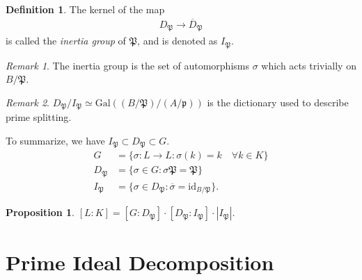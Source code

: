 \documentclass[12pt]{article}
\theoremstyle{plain}
\newtheorem{proposition}[theorem]{Proposition}
\theoremstyle{remark}
\newtheorem*{remark}{Remark}
\theoremstyle{definition}
\newtheorem{definition}[theorem]{Definition}
\begin{document}
\begin{definition}
    The kernel of the map
    \begin{align*}
        D_\mathfrak{P} \to \overline{D}_{\mathfrak{P}}
    \end{align*}
    is called the \emph{inertia group} of $\mathfrak{P}$, and is denoted as $I_\mathfrak{P}$.
\end{definition}
\begin{remark}
    The inertia group is the set of automorphisms $\sigma$ which acts trivially on $B/\mathfrak{P}$.
\end{remark}
\begin{remark}
    $D_\mathfrak{P}/I_\mathfrak{P}\simeq \mathrm{Gal}((B/\mathfrak{P})/(A/\mathfrak{p}))$ is the dictionary used to describe prime splitting.
\end{remark}

To summarize, we have $I_\mathfrak{P}\subset D_\mathfrak{P}\subset G$.
\begin{align*}
    G &= \{\sigma:L\to L:\sigma(k)=k\quad\forall k\in K\} \\
    D_\mathfrak{P} &= \{\sigma\in G: \sigma\mathfrak{P}=\mathfrak{P}\} \\
    I_\mathfrak{P} &= \{\sigma\in D_\mathfrak{P}:\overline{\sigma}=\mathrm{id}_{B/\mathfrak{P}}\}.
\end{align*}

\begin{proposition}
    $[L:K]=[G:D_\mathfrak{P}] \cdot [D_{\mathfrak{P}}:I_\mathfrak{P}] \cdot |I_\mathfrak{P}|$.
\end{proposition}


\clearpage
\section{Prime Ideal Decomposition}
\end{document}
